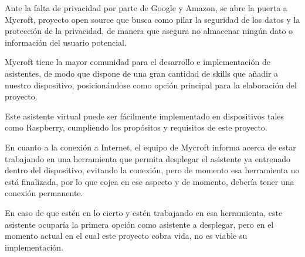 Ante la falta de privacidad por parte de Google y Amazon, se abre la puerta a Mycroft, proyecto open source que busca como pilar la seguridad de los datos y la protección de la privacidad, de manera que asegura no almacenar ningún dato o información del usuario potencial.

Mycroft tiene la mayor comunidad para el desarrollo e implementación de asistentes, de modo que dispone de una gran cantidad de skills que añadir a nuestro dispositivo, posicionándose como opción principal para la elaboración del proyecto.

Este asistente virtual puede ser fácilmente implementado en dispositivos tales como Raspberry, cumpliendo los propósitos y requisitos de este proyecto.

En cuanto a la conexión a Internet, el equipo de Mycroft informa acerca de estar trabajando en una herramienta que permita desplegar el asistente ya entrenado dentro del dispositivo, evitando la conexión, pero de momento esa herramienta no está finalizada, por lo que cojea en ese aspecto y de momento, debería tener una conexión permanente.

En caso de que estén en lo cierto y estén trabajando en esa herramienta, este asistente ocuparía la primera opción como asistente a desplegar, pero en el momento actual en el cual este proyecto cobra vida, no es viable su implementación.


